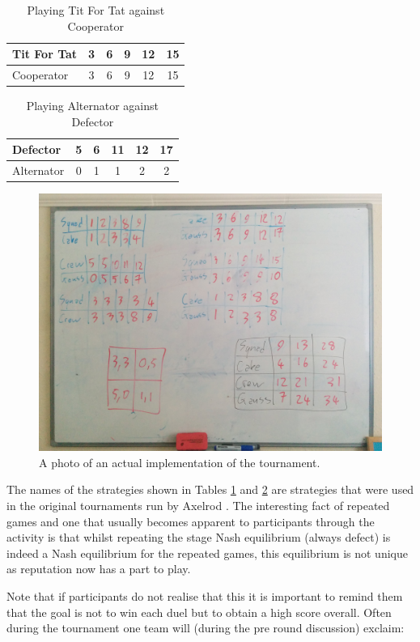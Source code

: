 \documentclass{article}
\begin{document}
\begin{table}[!htbp]
    \caption{Playing Tit For Tat against Cooperator}
    \centering
    \begin{tabular}{lccccc}
        \toprule
        Tit For Tat&3&6&9&12&15\\
        \midrule
        Cooperator&3&6&9&12&15\\
        \bottomrule
    \end{tabular}
    \label{tab:duel}
\end{table}

\begin{table}[!htbp]
    \caption{Playing Alternator against Defector}
    \centering
    \begin{tabular}{lccccc}
        \toprule
        Defector&5&6&11&12&17\\
        \midrule
        Alternator&0&1&1&2&2\\
        \bottomrule
    \end{tabular}
    \label{tab:duel_1}
\end{table}

\begin{figure}[!hbtp]
    \centering
    \includegraphics[width=.5\textwidth]{static/white_board.jpg}
    \caption{A photo of an actual implementation of the tournament.}
    \label{fig:white_board}
\end{figure}

The names of the strategies shown in Tables \ref{tab:duel} and \ref{tab:duel_1}
are strategies that were used in the original tournaments run by Axelrod
\cite{Axelrod1980a, Axelrod1980b}. The interesting fact of repeated games and
one that usually becomes apparent to participants through the activity is that
whilst repeating the stage Nash equilibrium (always defect) is indeed a Nash
equilibrium for the repeated games, this equilibrium is not unique as reputation
now has a part to play.

Note that if participants do not realise that this it is important to remind
them that the goal is not to win each duel but to obtain a high score overall.
Often during the tournament one team will (during the pre round discussion)
exclaim:
\end{document}
